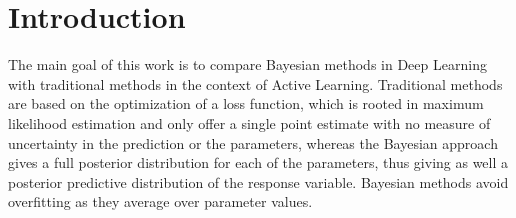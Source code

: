 
\chapter{Introduction}
\label{ch:intro}



The main goal of this work is to compare Bayesian methods in Deep Learning with traditional methods in the context of Active Learning. Traditional methods are based on the optimization of a loss function, which is rooted in maximum likelihood estimation and only offer a single point estimate with no measure of uncertainty in the prediction or the parameters, whereas the Bayesian approach gives a full posterior distribution for each of the parameters, thus giving as well a posterior predictive distribution of the response variable. Bayesian methods avoid overfitting as they average over parameter values.

